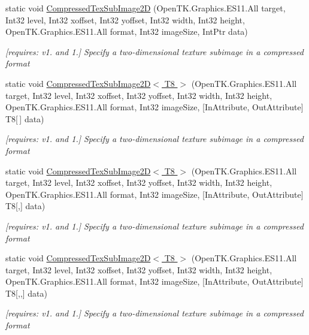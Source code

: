 \begin{DoxyCompactItemize}
static void \hyperlink{class_open_t_k_1_1_graphics_1_1_e_s11_1_1_g_l_ab02e7a6d11a4aa6dff21e65eebca2dfb}{Compressed\-Tex\-Sub\-Image2\-D} (Open\-T\-K.\-Graphics.\-E\-S11.\-All target, Int32 level, Int32 xoffset, Int32 yoffset, Int32 width, Int32 height, Open\-T\-K.\-Graphics.\-E\-S11.\-All format, Int32 image\-Size, Int\-Ptr data)
\begin{DoxyCompactList}\small\item\em \mbox{[}requires\-: v1. and 1.\mbox{]} Specify a two-\/dimensional texture subimage in a compressed format \end{DoxyCompactList}\item 
static void \hyperlink{class_open_t_k_1_1_graphics_1_1_e_s11_1_1_g_l_aa7682a03f2f83e12940713a6e1a15993}{Compressed\-Tex\-Sub\-Image2\-D$<$ T8 $>$} (Open\-T\-K.\-Graphics.\-E\-S11.\-All target, Int32 level, Int32 xoffset, Int32 yoffset, Int32 width, Int32 height, Open\-T\-K.\-Graphics.\-E\-S11.\-All format, Int32 image\-Size, \mbox{[}In\-Attribute, Out\-Attribute\mbox{]} T8\mbox{[}$\,$\mbox{]} data)
\begin{DoxyCompactList}\small\item\em \mbox{[}requires\-: v1. and 1.\mbox{]} Specify a two-\/dimensional texture subimage in a compressed format \end{DoxyCompactList}\item 
static void \hyperlink{class_open_t_k_1_1_graphics_1_1_e_s11_1_1_g_l_a9b39a0f7f2a20e0438e4cb07f72f7056}{Compressed\-Tex\-Sub\-Image2\-D$<$ T8 $>$} (Open\-T\-K.\-Graphics.\-E\-S11.\-All target, Int32 level, Int32 xoffset, Int32 yoffset, Int32 width, Int32 height, Open\-T\-K.\-Graphics.\-E\-S11.\-All format, Int32 image\-Size, \mbox{[}In\-Attribute, Out\-Attribute\mbox{]} T8\mbox{[},\mbox{]} data)
\begin{DoxyCompactList}\small\item\em \mbox{[}requires\-: v1. and 1.\mbox{]} Specify a two-\/dimensional texture subimage in a compressed format \end{DoxyCompactList}\item 
static void \hyperlink{class_open_t_k_1_1_graphics_1_1_e_s11_1_1_g_l_ae8eb4c4d113f85b554475a745cccd46b}{Compressed\-Tex\-Sub\-Image2\-D$<$ T8 $>$} (Open\-T\-K.\-Graphics.\-E\-S11.\-All target, Int32 level, Int32 xoffset, Int32 yoffset, Int32 width, Int32 height, Open\-T\-K.\-Graphics.\-E\-S11.\-All format, Int32 image\-Size, \mbox{[}In\-Attribute, Out\-Attribute\mbox{]} T8\mbox{[},,\mbox{]} data)
\begin{DoxyCompactList}\small\item\em \mbox{[}requires\-: v1. and 1.\mbox{]} Specify a two-\/dimensional texture subimage in a compressed format \end{DoxyCompactList}\item 

\end{DoxyCompactItemize}
